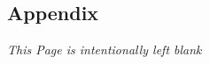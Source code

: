 \documentclass[oneside,openany,obeyspaces]{book}
\begin{document}
\begin{flushleft}

    \chapter{Appendix}

    \vspace{1.5cm}
    \begin{center}
        \textit{This Page is intentionally left blank}
    \end{center}
    \newpage



\end{flushleft}
\end{document}
